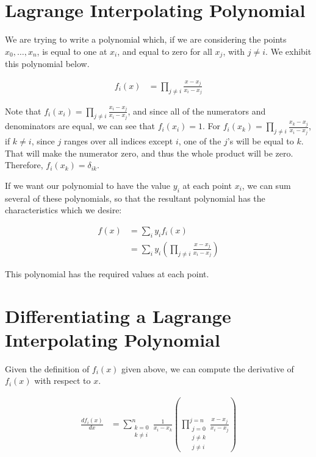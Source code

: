 \documentclass{article}
\begin{document}
\section{Lagrange Interpolating Polynomial}

We are trying to write a polynomial which, if we are considering
	the points $x_0, \dots, x_n$, is equal to one at $x_i$,
	and equal to zero for all $x_j$, with $j \neq i$.
We exhibit this polynomial below.

\begin{align}
f_i(x) & = \prod_{j \neq i} \frac{x - x_j}{x_i - x_j}
\end{align}

Note that $f_i(x_i) = \prod_{j \neq i} \frac{x_i - x_j}{x_i - x_j}$,
	and since all of the numerators and denominators are equal,
	we can see that $f_i(x_i) = 1$.
For $f_i(x_k) = \prod_{j \neq i} \frac{x_k - x_j}{x_i - x_j}$,
	if $k \neq i$, since $j$ ranges over all indices except $i$,
	one of the $j$'s will be equal to $k$.
That will make the numerator zero, and thus the whole product
	will be zero.
Therefore, $f_i(x_k) = \delta_{ik}$.

If we want our polynomial to have the value $y_i$ at each
	point $x_i$, we can sum several of these polynomials, so that
	the resultant polynomial has the characteristics which we desire:

\begin{align}
f(x) & = \sum_i y_i f_i(x) \\
& = \sum_i y_i 
	\left( \prod_{j \neq i} \frac{x-x_j}{x_i-x_j} \right)
\end{align}

This polynomial has the required values at each point.

\section{Differentiating a Lagrange Interpolating Polynomial}

Given the definition of $f_i(x)$ given above, we can compute
	the derivative of $f_i(x)$ with respect to $x$.

\begin{align}
\frac{d f_i(x)}{dx} & = \sum_{\begin{matrix}k=0\\k\neq i\end{matrix}}^n 
	\frac{1}{x_i - x_k}
	\left( \prod_{
		\begin{matrix} j = 0 \\ j \neq k\\j \neq i \end{matrix}}^{j=n}
		\frac{x - x_j}{x_i - x_j} \right)
\end{align}
\end{document}
